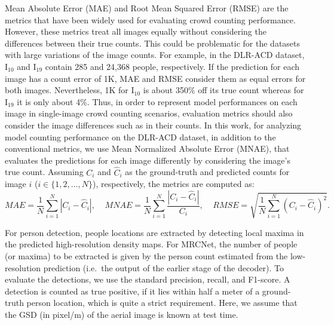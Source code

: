 \documentclass{bmvc2k}
\newcommand{\XNET}{MRCNet}
\begin{document}
Mean Absolute Error (MAE) and Root Mean Squared Error (RMSE) are the metrics that have been widely used for evaluating crowd counting performance.
However, these metrics treat all images equally without considering the differences between their true counts. This could be problematic for the datasets with large variations of the image counts. For example, in the DLR-ACD dataset, I$_{10}$ and I$_{19}$ contain 285 and 24,368 people, respectively. If the prediction for each image has a count error of 1K, MAE and RMSE consider them as equal errors for both images. Nevertheless, 1K for I$_{10}$ is about 350\% off its true count whereas for I$_{19}$ it is only about 4\%. Thus, in order to represent model performances on each image in single-image crowd counting scenarios, evaluation metrics should also consider the image differences such as in their counts. In this work, for analyzing model counting performance on the DLR-ACD dataset, in addition to the conventional metrics, we use Mean Normalized Absolute Error (MNAE), that evaluates the predictions for each image differently by considering the image's true count. Assuming $C_i$ and $\hat{C}_i$ as the ground-truth and predicted counts for image $i$ ($i\in\{1,2, ...,N\}$), respectively, the metrics are computed as:
\begin{equation}
    MAE=\frac{1}{N}\sum_{i=1}^{N}|C_i - \hat{C}_i|,\;\;\;\; MNAE = \frac{1}{N}\sum_{i=1}^{N}\frac{|C_i - \hat{C}_i|}{C_i},\;\;\;\; RMSE=\sqrt{\frac{1}{N}\sum_{i=1}^{N}(C_i - \hat{C}_i)^2}.
\end{equation}

For person detection, people locations are extracted by detecting local maxima in the predicted high-resolution density maps. For \XNET, the number of people (or maxima) to be extracted is given by the person count estimated from the low-resolution prediction (i.e.\ the output of the earlier stage of the decoder). 
To evaluate the detections, we use the standard precision, recall, and F1-score. A detection is counted as true positive, if it lies within half a meter of a ground-truth person location, which is quite a strict requirement. Here, we assume that the GSD (in pixel/m) of the aerial image is known at test time. 
\end{document}
